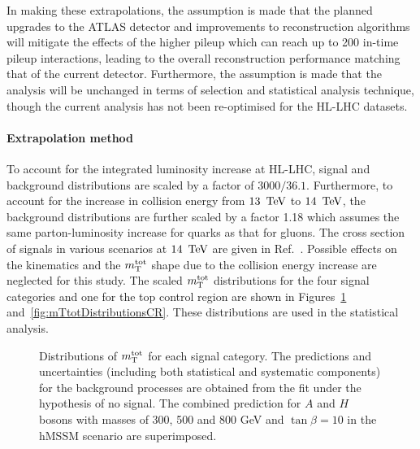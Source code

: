 In making these extrapolations, the assumption is made that the planned upgrades to the ATLAS detector and
improvements to reconstruction algorithms will mitigate the effects of the higher pileup which can reach up
to 200 in-time pileup interactions, leading to the overall reconstruction performance matching that of the current detector.
Furthermore, the assumption is made that the analysis will be unchanged in terms of selection and
statistical analysis technique, though the current analysis has not been re-optimised for the HL-LHC datasets.

\paragraph{Extrapolation method}
\label{sec:extrapolation method}
To account for the integrated luminosity increase at HL-LHC, signal and background distributions are scaled by
a factor of $3000/36.1$. Furthermore, to account for the increase in collision energy from $13~\,\text{Te\hspace{-.08em}V}$
to $14~\,\text{Te\hspace{-.08em}V}$, the background distributions are further scaled by a factor 1.18 which assumes the same
parton-luminosity increase for quarks as that for gluons. The cross section of signals in various scenarios
at $14~\,\text{Te\hspace{-.08em}V}$ are given in Ref.~\cite{deFlorian:2016spz}. Possible effects on the kinematics and the $m_\textnormal{T}^\textnormal{tot}$
shape due to the collision energy increase are neglected for this study. The scaled $m_\textnormal{T}^\textnormal{tot}$ distributions
for the four signal categories and one for the top control region are shown in
Figures~\ref{fig:mTtotDistributionsSR} and~\ref{fig:mTtotDistributionsCR}. These distributions are used in
the statistical analysis.

\begin{figure}[!ht]
    \centering
        \qquad
        \qquad
        \qquad
        \caption{Distributions of $m_\textnormal{T}^\textnormal{tot}$ for each signal category. The predictions and uncertainties (including both statistical and systematic components) for the background processes are obtained from the fit under the hypothesis of no signal. The combined prediction for $A$ and $H$ bosons with masses of 300, 500 and 800 \si{\GeV} and $\tan\beta= 10$ in the hMSSM scenario are superimposed. }

    \label{fig:mTtotDistributionsSR}
\end{figure}

